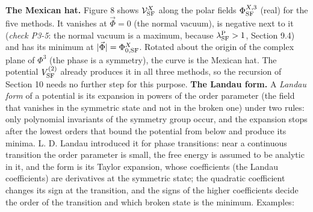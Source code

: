 \documentclass[
  10pt,
]{article}
\begin{document}
\textbf{The Mexican hat.} Figure 8 shows \(\mathcal V^X_{\rm SF}\) along
the polar fields \(\Phi^{X,3}_{\rm SF}\) (real) for the five methods. It
vanishes at \(\vec\Phi=0\) (the normal vacuum), is negative next to it
(\emph{check P3-5}: the normal vacuum is a maximum, because
\(\lambda^{\rm P}_{\rm SF}>1\), Section 9.4) and has its minimum at
\(\lvert\vec\Phi\rvert=\Phi^X_{0,{\rm SF}}\). Rotated about the origin
of the complex plane of \(\Phi^3\) (the phase is a symmetry), the curve
is the Mexican hat. The potential \(V^{(2)}_{\rm SF}\) already produces
it in all three methods, so the recursion of Section 10 needs no further
step for this purpose. \textbf{The Landau form.} A \emph{Landau form} of
a potential is its expansion in powers of the order parameter (the field
that vanishes in the symmetric state and not in the broken one) under
two rules: only polynomial invariants of the symmetry group occur, and
the expansion stops after the lowest orders that bound the potential
from below and produce its minima. L. D. Landau introduced it for phase
transitions: near a continuous transition the order parameter is small,
the free energy is assumed to be analytic in it, and the form is its
Taylor expansion, whose coefficients (the Landau coefficients) are
derivatives at the symmetric state; the quadratic coefficient changes
its sign at the transition, and the signs of the higher coefficients
decide the order of the transition and which broken state is the
minimum. Examples:
\end{document}
